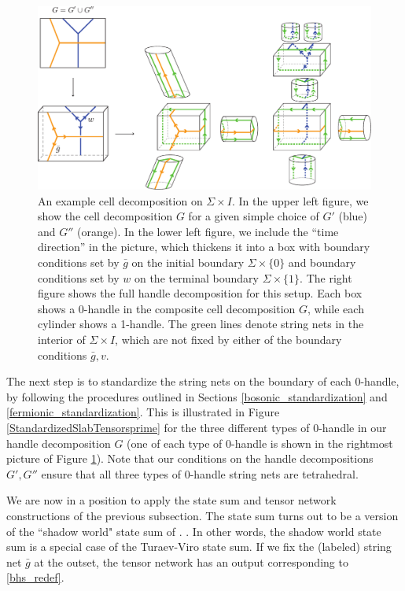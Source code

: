 \begin{figure}
\begin{centering}
\includegraphics[scale=.7]{VertexTypes.pdf}
\caption{\label{VertexTypes}
An example cell decomposition on $\Sigma \times I$. 
In the upper left figure, we show the cell decomposition $G$ for a given simple choice of $G'$ (blue) and $G''$ (orange). 
In the lower left figure, we include the ``time direction'' in the picture, which thickens it into a box with boundary conditions 
set by $\bar g$ on the initial boundary $\Sigma \times \{0\}$ and boundary conditions set by $w$ on the terminal boundary $\Sigma \times \{1\}$. 
The right figure shows the full handle decomposition for this setup. Each box shows a 0-handle in the composite cell decomposition $G$, 
while each cylinder shows a 1-handle. The green lines denote string nets in the interior of $\Sigma \times I$, which are not fixed 
by either of the boundary conditions $\bar g, v$.
}
\end{centering}
\end{figure}


The next step is to standardize the string nets on the boundary of each 0-handle, by following the procedures outlined in Sections \ref{bosonic_standardization} and \ref{fermionic_standardization}.
This is illustrated in Figure \ref{StandardizedSlabTensorsprime} for the three different types of 0-handle in our handle decomposition $G$ (one of each type of 0-handle is shown in the rightmost picture of Figure \ref{VertexTypes}).
Note that our conditions on the handle decompositions $G',G''$ ensure that all three types of 0-handle string nets are tetrahedral.

\medskip

We are now in a position to apply the state sum and tensor network constructions of the previous subsection.
The state sum turns out to be a version of the ``shadow world" state sum of \cite{kirillow1989,turaev2016quantum}. 
.
In other words, the shadow world state sum is a special case of the Turaev-Viro state sum.
If we fix the (labeled) string net $\bar g$ at the outset, the tensor network has an output corresponding to \eqref{bhs_redef}.

